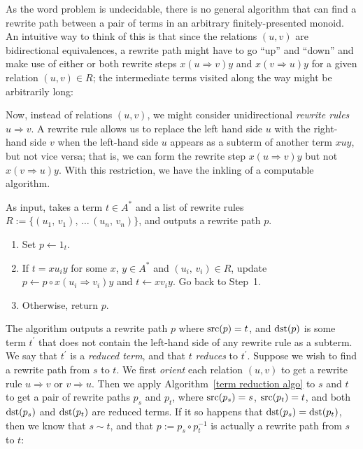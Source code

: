 \documentclass[../generics]{subfiles}
\begin{document}
As the word problem is undecidable, there is no general algorithm that can find a rewrite path between a pair of terms in an arbitrary finitely-presented monoid. An intuitive way to think of this is that since the relations $(u, v)$ are bidirectional equivalences, a rewrite path might have to go ``up'' and ``down'' and make use of either or both rewrite steps $x(u\Rightarrow v)y$ and $x(v\Rightarrow u)y$ for a given relation $(u, v)\in R$; the intermediate terms visited along the way might be arbitrarily long:
\begin{quote}
\end{quote}
Now, instead of relations $(u,v)$, we might consider unidirectional \emph{rewrite rules} $u\Rightarrow v$. A rewrite rule allows us to replace the left hand side $u$ with the right-hand side $v$ when the left-hand side $u$ appears as a subterm of another term $xuy$, but not vice versa; that is, we can form the rewrite step $x(u\Rightarrow v)y$ but not $x(v\Rightarrow u)y$. With this restriction, we have the inkling of a computable algorithm.
\begin{algorithm}\label{term reduction algo}
As input, takes a term $t\in A^*$ and a list of rewrite rules $R:=\{(u_1,\,v_1),\,\ldots\,(u_n,\,v_n)\}$, and outputs a rewrite path $p$.
\begin{enumerate}
\item Set $p\leftarrow 1_t$.
\item If $t=xu_iy$ for some $x$, $y\in A^*$ and $(u_i,\,v_i)\in R$, update $p\leftarrow p\circ x(u_i\Rightarrow v_i)y$ and $t\leftarrow xv_iy$. Go back to Step~1.
\item Otherwise, return $p$.
\end{enumerate}
\end{algorithm}
The algorithm outputs a rewrite path $p$ where $\operatorname{src}(p)=t$, and $\operatorname{dst}(p)$ is some term $t^\prime$ that does not contain the left-hand side of any rewrite rule as a subterm. We say that $t^\prime$ is a \emph{reduced term}, and that $t$ \emph{reduces} to $t^\prime$. Suppose we wish to find a rewrite path from $s$ to $t$. We first \emph{orient} each relation $(u, v)$ to get a rewrite rule $u\Rightarrow v$ or $v\Rightarrow u$. Then we apply Algorithm~\ref{term reduction algo} to $s$ and $t$ to get a pair of rewrite paths $p_s$ and $p_t$, where $\operatorname{src}(p_s)=s$, $\operatorname{src}(p_t)=t$, and both $\operatorname{dst}(p_s)$ and $\operatorname{dst}(p_t)$ are reduced terms. If it so happens that $\operatorname{dst}(p_s)=\operatorname{dst}(p_t)$, then we know that $s\sim t$, and that $p:= p_s \circ p_t^{-1}$ is actually a rewrite path from $s$ to $t$:
\end{document}
